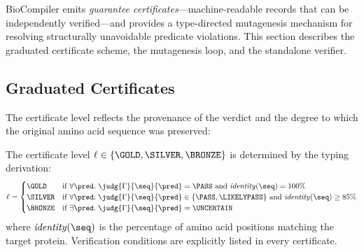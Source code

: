 BioCompiler emits \emph{guarantee certificates}---machine-readable
records that can be independently verified---and provides a
type-directed mutagenesis mechanism for resolving structurally
unavoidable predicate violations.
This section describes the graduated certificate scheme, the
mutagenesis loop, and the standalone verifier.

\subsection{Graduated Certificates}\label{sec:certs}

The certificate level reflects the provenance of the verdict and the
degree to which the original amino acid sequence was preserved:

\begin{definition}
The certificate level $\ell \in \{\GOLD, \SILVER, \BRONZE\}$ is
determined by the typing derivation:
\[
  \ell =
  \begin{cases}
    \GOLD & \text{if } \forall \pred.\;
            \judg{\Gamma}{\seq}{\pred} = \PASS
            \text{ and } \mathit{identity}(\seq) = 100\% \\
    \SILVER & \text{if } \forall \pred.\;
              \judg{\Gamma}{\seq}{\pred} \in \{\PASS, \LIKELYPASS\}
              \text{ and } \mathit{identity}(\seq) \ge 85\% \\
    \BRONZE & \text{if } \exists \pred.\;
              \judg{\Gamma}{\seq}{\pred} = \UNCERTAIN
  \end{cases}
\]
where $\mathit{identity}(\seq)$ is the percentage of amino acid
positions matching the target protein.
Verification conditions are explicitly listed in every \SILVER{}
certificate.
\end{definition}

